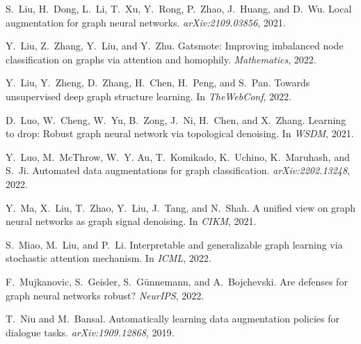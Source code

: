 \documentclass[11pt]{article}
\begin{document}
\begin{thebibliography}{10}
\begin{small}
S.~Liu, H.~Dong, L.~Li, T.~Xu, Y.~Rong, P.~Zhao, J.~Huang, and D.~Wu.
\newblock Local augmentation for graph neural networks.
\newblock \emph{arXiv:2109.03856}, 2021.

Y.~Liu, Z.~Zhang, Y.~Liu, and Y.~Zhu.
\newblock Gatsmote: Improving imbalanced node classification on graphs via
  attention and homophily.
\newblock \emph{Mathematics}, 2022{}.

Y.~Liu, Y.~Zheng, D.~Zhang, H.~Chen, H.~Peng, and S.~Pan.
\newblock Towards unsupervised deep graph structure learning.
\newblock In \emph{TheWebConf}, 2022{}.

D.~Luo, W.~Cheng, W.~Yu, B.~Zong, J.~Ni, H.~Chen, and X.~Zhang.
\newblock Learning to drop: Robust graph neural network via topological
  denoising.
\newblock In \emph{WSDM}, 2021.

Y.~Luo, M.~McThrow, W.~Y. Au, T.~Komikado, K.~Uchino, K.~Maruhash, and S.~Ji.
\newblock Automated data augmentations for graph classification.
\newblock \emph{arXiv:2202.13248}, 2022.

Y.~Ma, X.~Liu, T.~Zhao, Y.~Liu, J.~Tang, and N.~Shah.
\newblock A unified view on graph neural networks as graph signal denoising.
\newblock In \emph{CIKM}, 2021.

S.~Miao, M.~Liu, and P.~Li.
\newblock Interpretable and generalizable graph learning via stochastic
  attention mechanism.
\newblock In \emph{ICML}, 2022.

F.~Mujkanovic, S.~Geisler, S.~G{\"u}nnemann, and A.~Bojchevski.
\newblock Are defenses for graph neural networks robust?
\newblock \emph{NeurIPS}, 2022.

T.~Niu and M.~Bansal.
\newblock Automatically learning data augmentation policies for dialogue tasks.
\newblock \emph{arXiv:1909.12868}, 2019.


\end{small}
\end{thebibliography}
\end{document}
